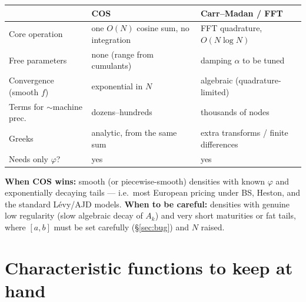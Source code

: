 \documentclass[11pt]{article}
\newcommand{\ch}{\varphi}
\begin{document}
\begin{center}
\renewcommand{\arraystretch}{1.25}
\begin{tabular}{p{4.3cm} p{5.0cm} p{5.0cm}}
\hline
& \textbf{COS} & \textbf{Carr--Madan / FFT} \\
\hline
Core operation & one $O(N)$ cosine sum, no integration & FFT quadrature, $O(N\log N)$ \\
Free parameters & none (range from cumulants) & damping $\alpha$ to be tuned \\
Convergence (smooth $f$) & exponential in $N$ & algebraic (quadrature-limited) \\
Terms for $\sim$machine prec. & dozens--hundreds & thousands of nodes \\
Greeks & analytic, from the same sum & extra transforms / finite differences \\
Needs only $\ch$? & yes & yes \\
\hline
\end{tabular}
\end{center}

\noindent\textbf{When COS wins:} smooth (or piecewise-smooth) densities with known $\ch$ and exponentially
decaying tails --- i.e.\ most European pricing under BS, Heston, and the standard L\'evy/AJD models. \textbf{When
to be careful:} densities with genuine low regularity (slow algebraic decay of $A_k$) and very short maturities
or fat tails, where $[a,b]$ must be set carefully (\S\ref{sec:bug}) and $N$ raised.

\section{Characteristic functions to keep at hand}\label{sec:cftable}
\end{document}
